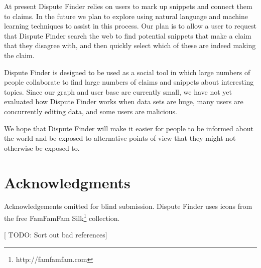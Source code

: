 \documentclass{www2010-submission}
\newcommand{\todo}[1]{{[\color{blue} TODO: #1]}}
\begin{document}
At present Dispute Finder relies on users to mark up snippets and connect them to claims. In the future we plan to explore using natural language and machine learning techniques to assist in this process. Our plan is to allow a user to request that Dispute Finder search the web to find potential snippets that make a claim that they disagree with, and then quickly select which of these are indeed making the claim.

Dispute Finder is designed to be used as a social tool in which large numbers of people collaborate to find large numbers of claims and snippets about interesting topics. Since our graph and user base are currently small, we have not yet evaluated how Dispute Finder works when data sets are huge, many users are concurrently editing data, and some users are malicious.

We hope that Dispute Finder will make it easier for people to be informed about the world and be exposed to alternative points of view that they might not otherwise be exposed to.

\section{Acknowledgments}

Acknowledgements omitted for blind submission. Dispute Finder uses icons from the free FamFamFam Silk\footnote{http://famfamfam.com} collection.


\todo{Sort out bad references}

\end{document}
